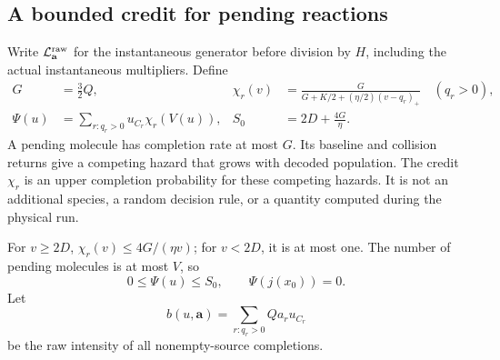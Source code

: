 \documentclass[11pt,reqno]{amsart}
\theoremstyle{definition}
\theoremstyle{remark}
\begin{document}
\subsection{A bounded credit for pending reactions}
Write $\mathcal L^{\rm raw}_{\mathbf a}$ for the instantaneous generator before
division by $H$, including the actual instantaneous multipliers. Define
\begin{align}
 G&=\tfrac32 Q, &
 \chi_r(v)&=\frac{G}{G+K/2+(\eta/2)(v-q_r)_+}\quad(q_r>0),\label{eq:chi}\\
 \Psi(u)&=\sum_{r:q_r>0}u_{C_r}\chi_r(V(u)), &
 S_0&=2D+\frac{4G}{\eta}.\label{eq:Psi}
\end{align}
A pending molecule has completion rate at most $G$. Its baseline and collision
returns give a competing hazard that grows with decoded population.
The credit $\chi_r$ is an upper completion probability for these competing
hazards. It is not an additional species, a random decision rule, or a quantity
computed during the physical run.

For $v\ge2D$, $\chi_r(v)\le4G/(\eta v)$; for $v<2D$, it is at most one.
The number of pending molecules is at most $V$, so
\begin{equation}\label{eq:Psi-bound}
 0\le\Psi(u)\le S_0,\qquad \Psi(j(x_0))=0.
\end{equation}
Let
\begin{equation}\label{eq:b-complete}
 b(u,\mathbf a)=\sum_{r:q_r>0}Q a_r u_{C_r}
\end{equation}
be the raw intensity of all nonempty-source completions.
\end{document}
